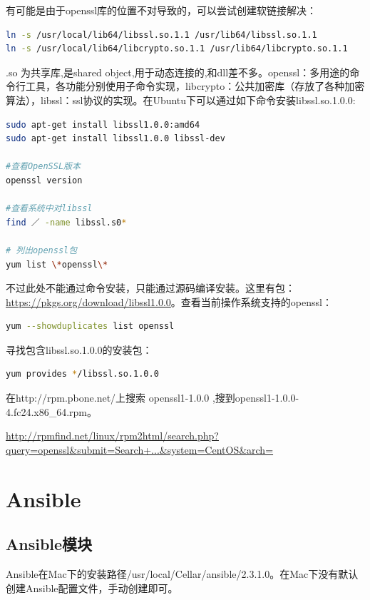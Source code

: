 \documentclass[letter]{book}
\begin{document}
有可能是由于openssl库的位置不对导致的，可以尝试创建软链接解决：

\begin{lstlisting}[language=bash]
ln -s /usr/local/lib64/libssl.so.1.1 /usr/lib64/libssl.so.1.1  
ln -s /usr/local/lib64/libcrypto.so.1.1 /usr/lib64/libcrypto.so.1.1  
\end{lstlisting}

.so 为共享库,是shared object,用于动态连接的,和dll差不多。openssl：多用途的命令行工具，各功能分别使用子命令实现，libcrypto：公共加密库（存放了各种加密算法），libssl：ssl协议的实现。在Ubuntu下可以通过如下命令安装libssl.so.1.0.0:

\begin{lstlisting}[language=bash]
sudo apt-get install libssl1.0.0:amd64
sudo apt-get install libssl1.0.0 libssl-dev

#查看OpenSSL版本
openssl version

#查看系统中对libssl
find ／ -name libssl.s0*

# 列出openssl包
yum list \*openssl\*
\end{lstlisting}

不过此处不能通过命令安装，只能通过源码编译安装。这里有包： \url{https://pkgs.org/download/libssl1.0.0}。查看当前操作系统支持的openssl：

\begin{lstlisting}[language=bash]
yum --showduplicates list openssl
\end{lstlisting}

寻找包含libssl.so.1.0.0的安装包：

\begin{lstlisting}[language=bash]
yum provides */libssl.so.1.0.0
\end{lstlisting}

在http://rpm.pbone.net/上搜索 openssl1-1.0.0 ,搜到openssl1-1.0.0-4.fc24.x86\_64.rpm。

\url{http://rpmfind.net/linux/rpm2html/search.php?query=openssl&submit=Search+...&system=CentOS&arch=}

\section{Ansible}

\subsection{Ansible模块}

Ansible在Mac下的安装路径/usr/local/Cellar/ansible/2.3.1.0。在Mac下没有默认创建Ansible配置文件，手动创建即可。
\end{document}
